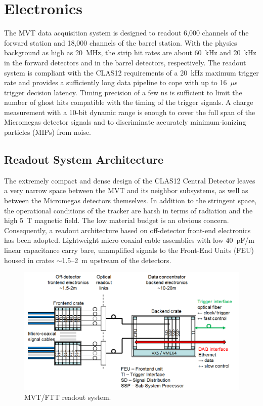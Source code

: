 \section{Electronics}

The MVT data acquisition system is designed to readout 6,000 channels of the forward station and 18,000 channels of the
barrel station. With the physics background as high as 20~MHz, the strip hit rates are about 60~kHz and 20~kHz in the
forward detectors and in the barrel detectors, respectively. The readout system is compliant with the CLAS12 requirements
of a 20~kHz maximum trigger rate and provides a sufficiently long data pipeline to cope with up to 16~$\mu$s trigger decision
latency. Timing precision of a few ns is sufficient to limit the number of ghost hits compatible with the timing of the trigger
signals. A charge measurement with a 10-bit dynamic range is enough to cover the full span of the Micromegas detector signals
and to discriminate accurately minimum-ionizing particles (MIPs) from noise.

\subsection{Readout System Architecture}

The extremely compact and dense design of the CLAS12 Central Detector leaves a very narrow space between the MVT and
its neighbor subsystems, as well as between the Micromegas detectors themselves.  In addition to the stringent space, the
operational conditions of the tracker are harsh in terms of radiation and the high 5~T magnetic field. The low material budget
is an obvious concern. Consequently, a readout architecture based on off-detector front-end electronics has been adopted.
Lightweight micro-coaxial cable assemblies with low 40~pF/m linear capacitance carry bare, unamplified signals to the Front-End
Units (FEU) housed in crates $\sim$1.5--2~m upstream of the detectors. 

\begin{figure}[htb]
 \includegraphics[width=1.0\columnwidth,keepaspectratio]{images/electronics_fig1.png}
 \caption{MVT/FTT readout system.}
 \label{fig:mm-e_1}
\end{figure}

